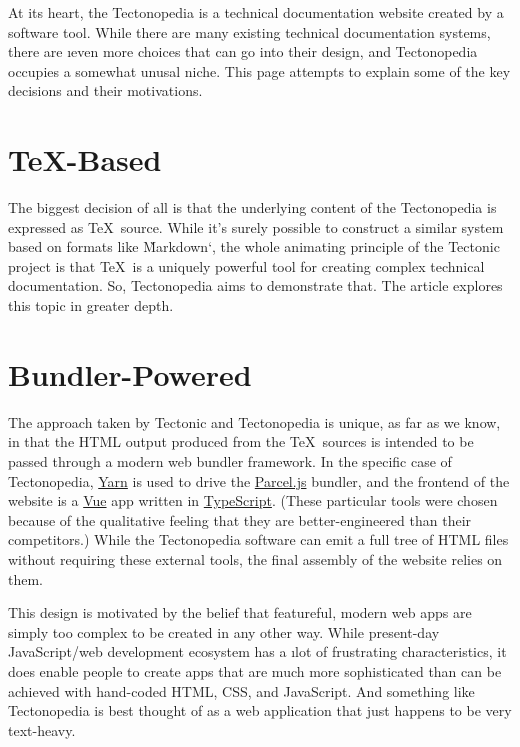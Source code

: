 
At its heart, the Tectonopedia is a technical documentation website created by a
software tool. While there are many existing technical documentation systems,
there are \i{even more} choices that can go into their design, and Tectonopedia
occupies a somewhat unusal niche. This page attempts to explain some of the key
decisions and their motivations.

\section*{\TeX-Based}

The biggest decision of all is that the underlying content of the Tectonopedia
is expressed as \TeX\ source. While it's surely possible to construct a similar
system based on formats like \`Markdown`, the whole animating principle of the
Tectonic project is that \TeX\ is a uniquely powerful tool for creating complex
technical documentation. So, Tectonopedia aims to demonstrate that. The article
 explores this topic in greater depth.

\section*{Bundler-Powered}

The approach taken by Tectonic and Tectonopedia is unique, as far as we know, in
that the HTML output produced from the \TeX\ sources is intended to be passed
through a modern web bundler framework. In the specific case of Tectonopedia,
\href{https://yarnpkg.com/}{Yarn} is used to drive the
\href{https://parceljs.org/}{Parcel.js} bundler, and the frontend of the website
is a \href{https://vuejs.org/}{Vue} app written in
\href{https://typescriptlang.org/}{TypeScript}. (These particular tools were
chosen because of the qualitative feeling that they are better-engineered than
their competitors.) While the Tectonopedia software can emit a full tree of HTML
files without requiring these external tools, the final assembly of the website
relies on them.

This design is motivated by the belief that featureful, modern web apps are
simply too complex to be created in any other way. While present-day
JavaScript/web development ecosystem has a \i{lot} of frustrating
characteristics, it does enable people to create apps that are much more
sophisticated than can be achieved with hand-coded HTML, CSS, and JavaScript.
And something like Tectonopedia is best thought of as a web application that
just happens to be very text-heavy.

